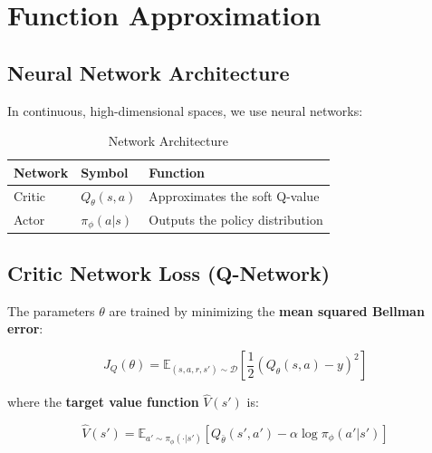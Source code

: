 \documentclass[12pt,a4paper]{article}
\theoremstyle{noteplain}
\theoremstyle{noteexercise}
\begin{document}


\section{Function Approximation}\label{sec:func-approx}



\subsection{Neural Network Architecture}\label{ssec:nn-arch}



In continuous, high-dimensional spaces, we use neural networks:

\begin{table}[H]
  \centering
  \caption{Network Architecture}
  \label{tab:nn-arch}
  \begin{tabular}{m{3cm}m{3cm}m{5cm}}
    \toprule
    \textbf{Network} & \textbf{Symbol} & \textbf{Function} \\
    \midrule
    Critic & $Q_\theta(s,a)$ & Approximates the soft Q-value \\
    Actor & $\pi_\phi(a|s)$ & Outputs the policy distribution \\
    \bottomrule
  \end{tabular}
\end{table}



\subsection{Critic Network Loss (Q-Network)}\label{ssec:critic-loss}



The parameters $\theta$ are trained by minimizing the \textbf{mean squared Bellman error}:

\begin{equation}\label{eq:critic-loss}
\boxed{J_Q(\theta) = \mathbb{E}_{(s,a,r,s') \sim \mathcal{D}}\left[\frac{1}{2}\left(Q_\theta(s,a) - y\right)^2\right]}
\end{equation}

where the \textbf{target value function} $\hat{V}(s')$ is:

$$\hat{V}(s') = \mathbb{E}_{a' \sim \pi_\phi(\cdot|s')}\left[Q_{\bar{\theta}}(s', a') - \alpha \log\pi_\phi(a'|s')\right]$$
\end{document}
